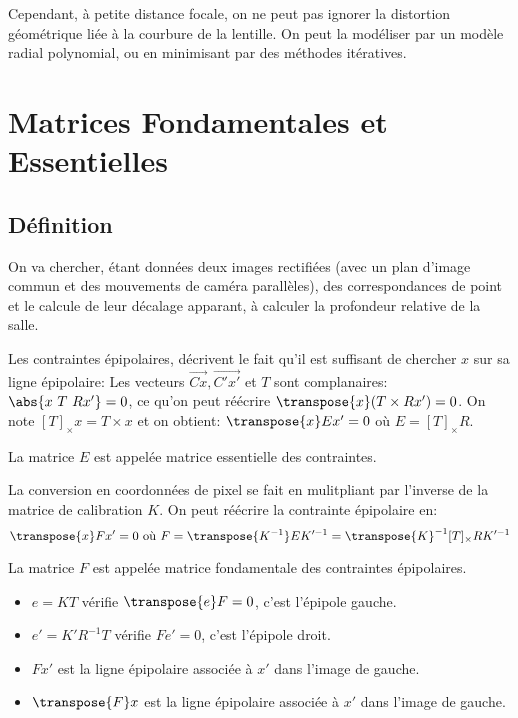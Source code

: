 \documentclass[info, math]{mpb-cours}
\begin{document}
Cependant, à petite distance focale, on ne peut pas ignorer la distortion géométrique liée à la courbure de la lentille.
On peut la modéliser par un modèle radial polynomial, ou en minimisant par des méthodes itératives.

\section{Matrices Fondamentales et Essentielles}
\subsection{Définition}
On va chercher, étant données deux images rectifiées (avec un plan d'image commun et des mouvements de caméra parallèles), des correspondances de point et le calcule de leur décalage apparant, à calculer la profondeur relative de la salle.

Les contraintes épipolaires, décrivent le fait qu'il est suffisant de chercher $x$ sur sa ligne épipolaire:
Les vecteurs $\vec{Cx}, \vec{C'x'}$ et $T$ sont complanaires: $\abs{x \ T \ Rx'} = 0$, ce qu'on peut réécrire $\transpose{x}(T \times Rx') = 0$.
On note $[T]_{\times} x = T \times x$ et on obtient: $\transpose{x}Ex' = 0$ où $E = [T]_{\times}R$.

\begin{definition}
	La matrice $E$ est appelée matrice essentielle des contraintes.
\end{definition}

La conversion en coordonnées de pixel se fait en mulitpliant par l'inverse de la matrice de calibration $K$.
On peut réécrire la contrainte épipolaire en:
\begin{equation*}
	\transpose{x}Fx' = 0 \text{ où } F = \transpose{K^{-1}}EK'^{-1} = \transpose{K}^{-1}[T]_{\times}RK'^{-1}
\end{equation*}

\begin{definition}
	La matrice $F$ est appelée matrice fondamentale des contraintes épipolaires.
\end{definition}

\begin{definition}
	\begin{itemize}
		\item $e = KT$ vérifie $\transpose{e}F = 0$, c'est l'épipole gauche.
		\item $e' = K'R^{-1}T$ vérifie $Fe' = 0$, c'est l'épipole droit.
		\item $Fx'$ est la ligne épipolaire associée à $x'$ dans l'image de gauche.
		\item $\transpose{F}x$ est la ligne épipolaire associée à $x'$ dans l'image de gauche.
	\end{itemize}
\end{definition}
\end{document}
